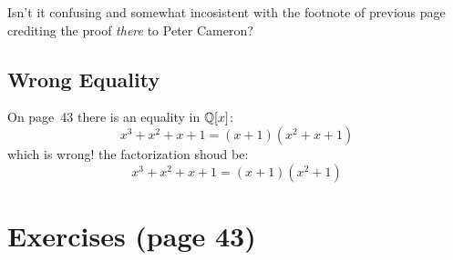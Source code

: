 Isn't it confusing and somewhat incosistent with the footnote
of previous page crediting the proof \emph{there} to Peter Cameron?

\subsection{Wrong Equality}

On page~43 there is an equality in \(\mathbb{Q}[x]\):
\begin{equation*}
x^3+x^2+x+1 = (x+1)(x^2+x+1)
\end{equation*}
which is wrong! the factorization shoud be:
\begin{equation*}
x^3+x^2+x+1 = (x+1)(x^2+1)
\end{equation*}



\section{Exercises (page 43)}

